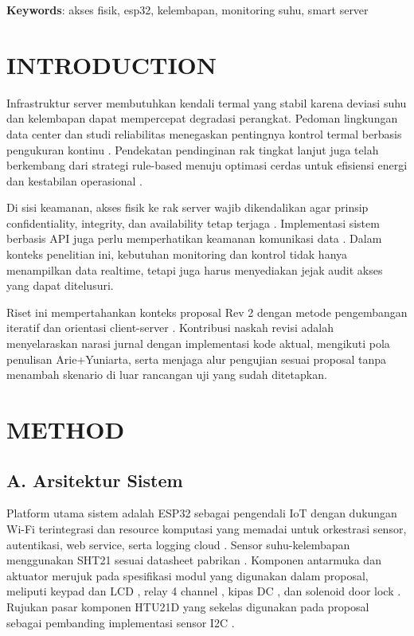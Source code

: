 \documentclass[10pt,a4paper,twocolumn]{article}
\begin{document}
\vspace{0.15cm}
\noindent\textbf{Keywords}: akses fisik, esp32, kelembapan, monitoring suhu, smart server

\section{INTRODUCTION}
Infrastruktur server membutuhkan kendali termal yang stabil karena deviasi suhu dan kelembapan dapat mempercepat degradasi perangkat. Pedoman lingkungan data center dan studi reliabilitas menegaskan pentingnya kontrol termal berbasis pengukuran kontinu \citep{ashrae2021,shahi2022,cho2023,qu2024}. Pendekatan pendinginan rak tingkat lanjut juga telah berkembang dari strategi rule-based menuju optimasi cerdas untuk efisiensi energi dan kestabilan operasional \citep{wan2021,wan2023}.

Di sisi keamanan, akses fisik ke rak server wajib dikendalikan agar prinsip confidentiality, integrity, dan availability tetap terjaga \citep{stallings2017}. Implementasi sistem berbasis API juga perlu memperhatikan keamanan komunikasi data \citep{yusof2023,rfc8446_2018}. Dalam konteks penelitian ini, kebutuhan monitoring dan kontrol tidak hanya menampilkan data realtime, tetapi juga harus menyediakan jejak audit akses yang dapat ditelusuri.

Riset ini mempertahankan konteks proposal Rev 2 dengan metode pengembangan iteratif dan orientasi client-server \citep{andriana2023,priyadi2022}. Kontribusi naskah revisi adalah menyelaraskan narasi jurnal dengan implementasi kode aktual, mengikuti pola penulisan Arie+Yuniarta, serta menjaga alur pengujian sesuai proposal tanpa menambah skenario di luar rancangan uji yang sudah ditetapkan.

\section{METHOD}
\subsection*{A. Arsitektur Sistem}
Platform utama sistem adalah ESP32 sebagai pengendali IoT dengan dukungan Wi-Fi terintegrasi dan resource komputasi yang memadai untuk orkestrasi sensor, autentikasi, web service, serta logging cloud \citep{espressif2024}. Sensor suhu-kelembapan menggunakan SHT21 sesuai datasheet pabrikan \citep{sensirion2022}. Komponen antarmuka dan aktuator merujuk pada spesifikasi modul yang digunakan dalam proposal, meliputi keypad dan LCD \citep{indomaker2022,sunfounder2017,dfrobot2025}, relay 4 channel \citep{lazada2021}, kipas DC \citep{ubuy2026}, dan solenoid door lock \citep{multicomp2019,digiware2020}. Rujukan pasar komponen HTU21D yang sekelas digunakan pada proposal sebagai pembanding implementasi sensor I2C \citep{duaitek2026}.
\end{document}
